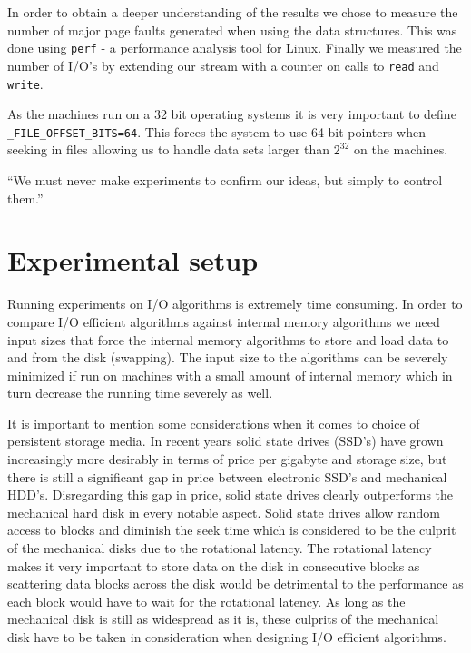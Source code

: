 \documentclass[twoside,11pt,openright]{report}
\begin{document}
In order to obtain a deeper understanding of the results we chose to measure the number of major page faults generated when using the data structures. This was done using \texttt{perf} - a performance analysis tool for Linux. Finally we measured the number of I/O's by extending our stream with a counter on calls to \texttt{read} and \texttt{write}.

As the machines run on a 32 bit operating systems it is very important to define \texttt{\_FILE\_OFFSET\_BITS=64}. This forces the system to use 64 bit pointers when seeking in files allowing us to handle data sets larger than $2^{32}$ on the machines.

\begin{savequote}[0.55\textwidth]
``We must never make experiments to confirm our ideas, but simply to control them.''
\end{savequote}
\chapter{Experimental setup}
\label{chp:experimental_setup}
Running experiments on I/O algorithms is extremely time consuming. In order to compare I/O efficient algorithms against internal memory algorithms we need input sizes that force the internal memory algorithms to store and load data to and from the disk (swapping). The input size to the algorithms can be severely minimized if run on machines with a small amount of internal memory which in turn decrease the running time severely as well.

It is important to mention some considerations when it comes to choice of persistent storage media. In recent years solid state drives (SSD's) have grown increasingly more desirably in terms of price per gigabyte and storage size, but there is still a significant gap in price between electronic SSD's and mechanical HDD's. Disregarding this gap in price, solid state drives clearly outperforms the mechanical hard disk in every notable aspect. Solid state drives allow random access to blocks and diminish the seek time which is considered to be the culprit of the mechanical disks due to the rotational latency.
The rotational latency makes it very important to store data on the disk in consecutive blocks as scattering data blocks across the disk would be detrimental to the performance as each block would have to wait for the rotational latency. As long as the mechanical disk is still as widespread as it is, these culprits of the mechanical disk have to be taken in consideration when designing I/O efficient algorithms.
\end{document}
